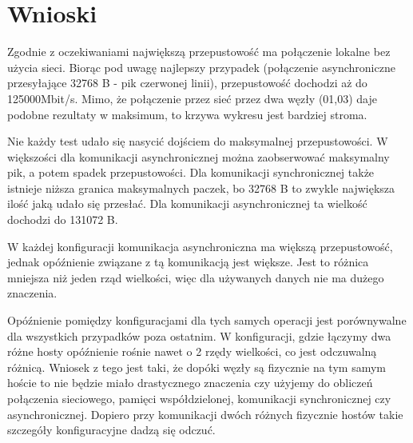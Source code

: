 \documentclass[10pt,english, openany]{book}
\begin{document}
\chapter{Wnioski}
\justifying
Zgodnie z oczekiwaniami największą przepustowość ma połączenie lokalne bez użycia sieci. Biorąc pod uwagę najlepszy przypadek (połączenie asynchroniczne przesyłające 32768 B - pik czerwonej linii), przepustowość dochodzi aż do 125000Mbit/s. Mimo, że połączenie przez sieć przez dwa węzły (01,03) daje podobne rezultaty w maksimum, to krzywa wykresu jest bardziej stroma. 

Nie każdy test udało się nasycić dojściem do maksymalnej przepustowości. W większości dla komunikacji asynchronicznej można zaobserwować maksymalny pik, a potem spadek przepustowości. Dla komunikacji synchronicznej także istnieje niższa granica maksymalnych paczek, bo 32768 B to zwykle największa ilość jaką udało się przesłać. Dla komunikacji asynchronicznej ta wielkość dochodzi do 131072 B.

W każdej konfiguracji komunikacja asynchroniczna ma większą przepustowość, jednak opóźnienie związane z tą komunikacją jest większe. Jest to różnica mniejsza niż jeden rząd wielkości, więc dla używanych danych nie ma dużego znaczenia.

Opóźnienie pomiędzy konfiguracjami dla tych samych operacji jest porównywalne dla wszystkich przypadków poza ostatnim. W konfiguracji, gdzie łączymy dwa różne hosty opóźnienie rośnie nawet o 2 rzędy wielkości, co jest odczuwalną różnicą. Wniosek z tego jest taki, że dopóki węzły są fizycznie na tym samym hoście to nie będzie miało drastycznego znaczenia czy użyjemy do obliczeń połączenia sieciowego, pamięci współdzielonej, komunikacji synchronicznej czy asynchronicznej. Dopiero przy komunikacji dwóch różnych fizycznie hostów takie szczegóły konfiguracyjne dadzą się odczuć.
\end{document}
